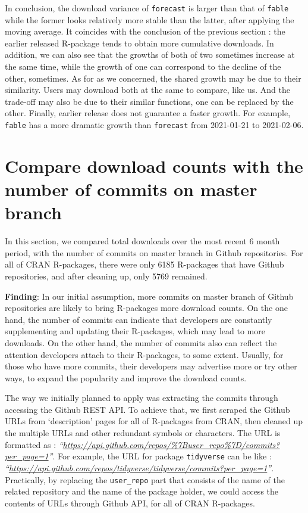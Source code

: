\documentclass[
]{book}
\newenvironment{discovery}[1]{%
  \begin{tcolorbox}[colback=blue!30,colframe=blue!80!black]#1}{\end{tcolorbox}}
\begin{document}
In conclusion, the download variance of \texttt{forecast} is larger than that of \texttt{fable} while the former looks relatively more stable than the latter, after applying the moving average. It coincides with the conclusion of the previous section : the earlier released R-package tends to obtain more cumulative downloads. In addition, we can also see that the growths of both of two sometimes increase at the same time, while the growth of one can correspond to the decline of the other, sometimes. As for as we concerned, the shared growth may be due to their similarity. Users may download both at the same to compare, like us. And the trade-off may also be due to their similar functions, one can be replaced by the other. Finally, earlier release does not guarantee a faster growth. For example, \texttt{fable} has a more dramatic growth than \texttt{forecast} from 2021-01-21 to 2021-02-06.

\hypertarget{compare-download-counts-with-the-number-of-commits-on-master-branch}{%
\section{Compare download counts with the number of commits on master branch}\label{compare-download-counts-with-the-number-of-commits-on-master-branch}}

In this section, we compared total downloads over the most recent 6 month period, with the number of commits on master branch in Github repositories. For all of CRAN R-packages, there were only 6185 R-packages that have Github repositories, and after cleaning up, only 5769 remained.

\begin{discovery}
\textbf{Finding}: In our initial assumption, more commits on master
branch of Github repositories are likely to bring R-packages more
download counts. On the one hand, the number of commits can indicate
that developers are constantly supplementing and updating their
R-packages, which may lead to more downloads. On the other hand, the
number of commits also can reflect the attention developers attach to
their R-packages, to some extent. Usually, for those who have more
commits, their developers may advertise more or try other ways, to
expand the popularity and improve the download counts.
\end{discovery}

The way we initially planned to apply was extracting the commits through accessing the Github REST API\autocite{githubapi}. To achieve that, we first scraped the Github URLs from `description' pages for all of R-packages from CRAN, then cleaned up the multiple URLs and other redundant symbols or characters. The URL is formatted as : \emph{``\url{https://api.github.com/repos/\%7Buser_repo\%7D/commits?per_page=1}''}. For example, the URL for package \texttt{tidyverse} can be like : \emph{``\url{https://api.github.com/repos/tidyverse/tidyverse/commits?per_page=1}''}. Practically, by replacing the \texttt{user\_repo} part that consists of the name of the related repository and the name of the package holder, we could access the contents of URLs through Github API, for all of CRAN R-packages.
\end{document}
